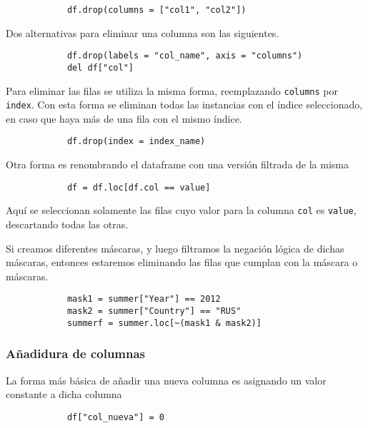 \begin{verbatim}
            df.drop(columns = ["col1", "col2"])    
            \end{verbatim}

Dos alternativas para eliminar una columna son las siguientes.

\begin{verbatim}
            df.drop(labels = "col_name", axis = "columns")
            del df["col"]
            \end{verbatim}

Para eliminar las filas se utiliza la misma forma, reemplazando
\texttt{columns} por \texttt{index}. Con esta forma se eliminan todas las
instancias con el índice seleccionado, en caso que haya más de una fila con el
mismo índice.

\begin{verbatim}
            df.drop(index = index_name)
            \end{verbatim}

Otra forma es renombrando el dataframe con una versión filtrada de la misma

\begin{verbatim}
            df = df.loc[df.col == value]
            \end{verbatim}

Aquí se seleccionan solamente las filas cuyo valor para la columna \texttt{col}
es \texttt{value}, descartando todas las otras.

Si creamos diferentes máscaras, y luego filtramos la negación lógica de dichas
máscaras, entonces estaremos eliminando las filas que cumplan con la máscara o
máscaras.

\begin{verbatim}
            mask1 = summer["Year"] == 2012
            mask2 = summer["Country"] == "RUS"
            summerf = summer.loc[~(mask1 & mask2)]
            \end{verbatim}

\subsubsection{Añadidura de columnas}

La forma más básica de añadir una nueva columna es asignando un valor constante
a dicha columna

\begin{verbatim}
            df["col_nueva"] = 0
            \end{verbatim}

